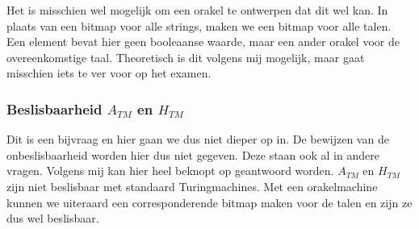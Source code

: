Het is misschien wel mogelijk om een orakel te ontwerpen dat dit wel kan. In plaats van een bitmap voor alle strings, maken we een bitmap voor alle talen. Een element bevat hier geen booleaanse waarde, maar een ander orakel voor de overeenkomstige taal. Theoretisch is dit volgens mij mogelijk, maar gaat misschien iets te ver voor op het examen.

\subsubsection*{Beslisbaarheid $A_{TM}$ en $H_{TM}$}

Dit is een bijvraag en hier gaan we dus niet dieper op in. De bewijzen van de onbeslisbaarheid worden hier dus niet gegeven. Deze staan ook al in andere vragen. Volgens mij kan hier heel beknopt op geantwoord worden. $A_{TM}$ en $H_{TM}$ zijn niet beslisbaar met standaard Turingmachines. Met een orakelmachine kunnen we uiteraard een corresponderende bitmap maken voor de talen en zijn ze dus wel beslisbaar.
